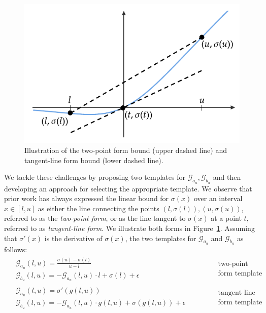 \begin{figure}[t]
	\centering
	\includegraphics[width=0.5\linewidth]{offlinesyn/figs/twopt_tanpt.pdf}
	\caption{Illustration of the two-point form bound (upper dashed line) and
	tangent-line form bound (lower dashed line).\label{offlinesyn:fig:twopttanpt}}
\end{figure}
We tackle these challenges by proposing two templates for $ \mathcal{G}_{a_u},
\mathcal{G}_{b_u} $ and then
developing an approach for selecting the appropriate template.
%
We observe that prior work has always expressed the linear bound for $
\sigma(x) $ over an interval $ x \in [l, u] $
as either the line connecting the points $ (l, \sigma(l)), (u, \sigma(u)) $,
referred to as the \textit{two-point form}, or as the line tangent to $
\sigma(x) $ at a point $ t $, referred to as \textit{tangent-line form}.
%
We illustrate both forms in
Figure~\ref{offlinesyn:fig:twopttanpt}.
Assuming that $ \sigma'(x) $ is the derivative of $ \sigma(x) $,
the two templates for $ \mathcal{G}_{a_u}$ and $\mathcal{G}_{b_u} $ as follows:
\begin{align}
\begin{aligned}
&\mathcal{G}_{a_u}(l, u) = \frac{\sigma(u) - \sigma(l)}{u - l} \\
&\mathcal{G}_{b_u}(l, u) = - \mathcal{G}_{a_u}(l, u) \cdot l + \sigma(l) +
\epsilon
\end{aligned} &\hspace{36pt}
\begin{aligned}
\text{two-point}\\
\text{form template}
\end{aligned}
\label{offlinesyn:eq:template-2pt}\\[2ex]
\begin{aligned}
&\mathcal{G}_{a_u}(l, u) = \sigma'(g(l, u)) \\
&\mathcal{G}_{b_u}(l, u) = -\mathcal{G}_{a_u}(l, u) \cdot g(l, u) +
\sigma(g(l, u)) + \epsilon
\end{aligned} &\hspace{36pt}
\begin{aligned}
\text{tangent-line}\\
\text{form template}
\end{aligned}
\label{offlinesyn:eq:template-tan}
\end{align}
